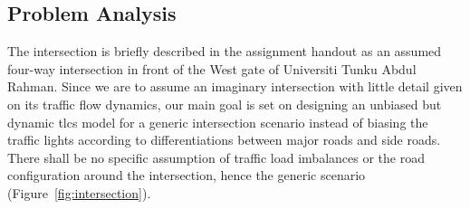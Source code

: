 \subsection{Problem Analysis}
The intersection is briefly described in the assignment handout as an assumed four-way intersection in front of the West gate of Universiti Tunku Abdul Rahman. Since we are to assume an imaginary intersection with little detail given on its traffic flow dynamics, our main goal is set on designing an unbiased but dynamic \ac{tlcs} model for a generic intersection scenario instead of biasing the traffic lights according to differentiations between major roads and side roads. There shall be no specific assumption of traffic load imbalances or the road configuration around the intersection, hence the generic scenario (Figure~\ref{fig:intersection}).
